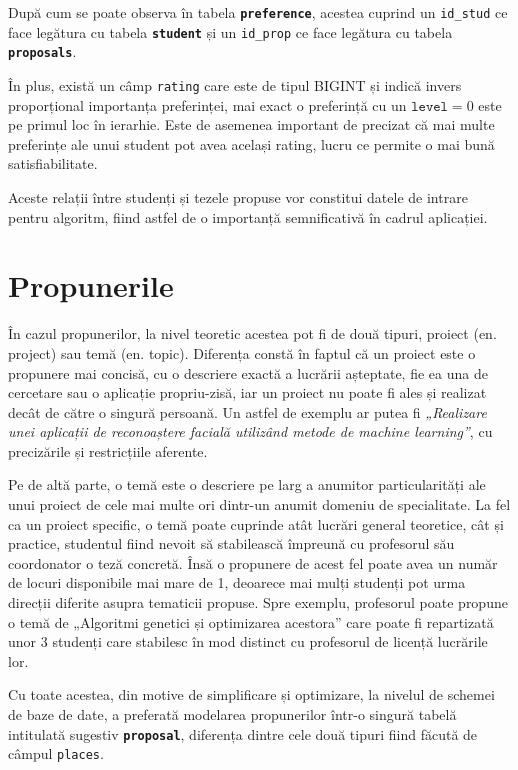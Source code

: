 După cum se poate observa în tabela \textbf{\texttt{preference}}, acestea cuprind un \texttt{id\_stud} ce face legătura cu tabela \textbf{\texttt{student}} și un \texttt{id\_prop} ce face legătura cu tabela \textbf{\texttt{proposals}}.

În plus, există un câmp \texttt{rating} care este de tipul BIGINT și indică invers proporțional importanța preferinței, mai exact o preferință cu un $\texttt{level} = 0 $ este pe primul loc în ierarhie. Este de asemenea important de precizat că mai multe preferințe ale unui student pot avea același rating, lucru ce permite o mai bună satisfiabilitate.

Aceste relații între studenți și tezele propuse vor constitui datele de intrare pentru algoritm, fiind astfel de o importanță semnificativă în cadrul aplicației.

\section{Propunerile}

În cazul propunerilor, la nivel teoretic acestea pot fi de două tipuri, proiect (en. project) sau temă (en. topic). Diferența constă în faptul că un proiect este o propunere mai concisă, cu o descriere exactă a lucrării așteptate, fie ea una de cercetare sau o aplicație propriu-zisă, iar un proiect nu poate fi ales și realizat decât de către o singură persoană.
Un astfel de exemplu ar putea fi \textit{„Realizare unei aplicații de reconoaștere facială utilizând metode de machine learning”}, cu precizările și restricțiile aferente.

Pe de altă parte, o temă este o descriere pe larg a anumitor particularități ale unui proiect de cele mai multe ori dintr-un anumit domeniu de specialitate. La fel ca un proiect specific, o temă poate cuprinde atât lucrări general teoretice, cât și practice, studentul fiind nevoit să stabilească împreună cu profesorul său coordonator o teză concretă. Însă o propunere de acest fel poate avea un număr de locuri disponibile mai mare de 1, deoarece mai mulți studenți pot urma direcții diferite asupra tematicii propuse. Spre exemplu, profesorul poate propune o temă de „Algoritmi genetici și optimizarea acestora” care poate fi repartizată unor 3 studenți care stabilesc în mod distinct cu profesorul de licență lucrările lor.

Cu toate acestea, din motive de simplificare și optimizare, la nivelul de schemei de baze de date, a preferată modelarea propunerilor într-o singură tabelă intitulată sugestiv \textbf{\texttt{proposal}}, diferența dintre cele două tipuri fiind făcută de câmpul \texttt{places}. 

